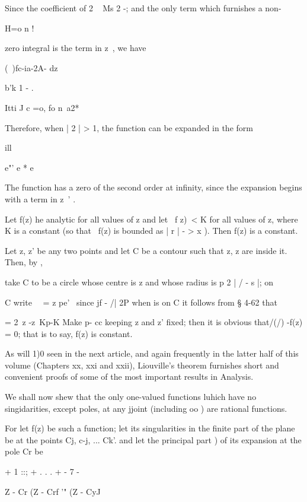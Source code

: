 {{{{Since the coefficient of 2 ~ Ms 2 -; and the only term which
furnishes a non-

H=o n !

zero integral is the term in z~, we have

(\ )fc-ia-2A- dz

b'k  1 - .

Itti J c =o, fo n\ a2*

%
%

Therefore, when | 2 | > 1, the function can be expanded in the form

ill

e"' e * e

The function has a zero of the second order at infinity, since the
expansion begins with a term in z~' .


Let f(z) he analytic for all values of z and let \ f z)\ < K for all
values of z, where K is a constant (so that \ f(z) is bounded as | r |
- > x ). Then f(z) is a constant.

Let z, z' be any two points and let C be a contour such that z, z are
inside it. Then, by ,

take C to be a circle whose centre is z and whose radius is p 2 | / -
s |; on

C write \ \ = z pe' \ since jf - /| 2P when is on C it follows from §
4-62 that

= 2\ z -z\ Kp-K Make p- cc keeping z and z' fixed; then it is obvious
that/(/) -f(z) = 0; that is to say, f(z) is constant.

As will 1)0 seen in the next article, and again frequently in the
latter half of this volume (Chapters xx, xxi and xxii), Liouville's
theorem furnishes short and convenient proofs of some of the most
important results in Analysis.


We shall now shew that the only one-valued functions luhich have no
singidarities, except poles, at any jjoint (including oo ) are
rational functions.

For let f(z) be such a function; let its singularities in the finite
part of the plane be at the points Cj, c-j, ... Ck'. and let the
principal part ) of its expansion at the pole Cr be

+ 1 ::; + . . . + - 7 -

Z - Cr (Z - Crf '" (Z - CyJ

}}}}
